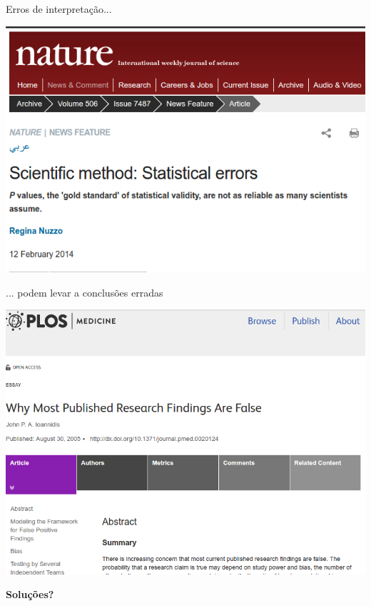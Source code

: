 \documentclass{beamer}
\begin{document}
\begin{frame}{Erros de interpretação...}
  \begin{center}
    \includegraphics[width=.95\textwidth]{Imagens/Nature-pvalor}
  \end{center}
\end{frame}

\begin{frame}{... podem levar a conclusões erradas}
  \begin{center}
    \includegraphics[width=.95\textwidth]{Imagens/Ioannidis}
  \end{center}
\end{frame}

\begin{frame}
  \begin{center}
    {\bf Soluções?}
  \end{center}
\end{frame}
\end{document}
